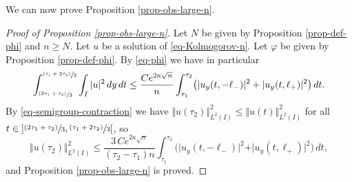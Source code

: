 \documentclass[11pt]{article}
\numberwithin{equation}{section}
\newcommand{\psfrac}[2]{\sfrac{(#1)}{#2}}
\theoremstyle{plain}
\theoremstyle{definition}
\newcommand{\abs}[1]{\vert #1\vert}
\newcommand{\nr}[1]{\Vert #1\Vert}
\newcommand{\1}{\mathds 1}
\let\k\kappa
\let\f\varphi
\begin{document}
We can now prove Proposition \ref{prop-obs-large-n}.

\begin{proof}[Proof of Proposition \ref{prop-obs-large-n}]
Let $N$ be given by Proposition \ref{prop-def-phi} and $n \geq N$. Let $u$ be a solution of \eqref{eq-Kolmogorov-n}. Let $\f$ be given by Proposition \ref{prop-def-phi}. By \eqref{eq-phi} we have in particular
\[
\int_{\psfrac{2 \tau_1 + \tau_2}{3}}^{\psfrac{\tau_1 + 2\tau_2}{3}} \int_{I} \abs{u}^2 \, dy \, dt \leq \frac {C e^{2 \k \sqrt n}} n \int_{\tau_1}^{\tau_2} \bigl(\abs{u_y (t,-\ell_-)}^2 + \abs{u_y(t,\ell_+)}^2 \bigr) \, dt.
\]
By \eqref{eq-semigroup-contraction} we have $\nr{u(\tau_2)}_{L^2(I)}^2 \leq \nr{u(t)}_{L^2(I)}^2$ for all $t \in{}] \psfrac{2\tau_1 + \tau_2}{3}, \psfrac{\tau_1 + 2\tau_2}{3}[$, so
\[
\nr{u(\tau_2)}_{L^2(I)}^2 \leq \frac{3\,C e^{2 \k \sqrt n}}{(\tau_2-\tau_1)n} \int_{\tau_1}^{\tau_2} \bigl(\abs{u_y (t,-\ell_-)}^2 + \abs{u_y(t,\ell_+)}^2 \bigr) \, dt,
\]
and Proposition \ref{prop-obs-large-n} is proved.
\end{proof}

\end{document}
